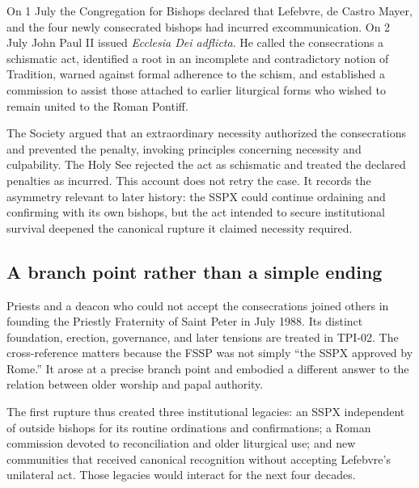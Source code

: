 On 1 July the Congregation for Bishops declared that Lefebvre, de Castro Mayer, and the four newly consecrated bishops had incurred excommunication. On 2 July John Paul II issued \emph{Ecclesia Dei adflicta}. He called the consecrations a schismatic act, identified a root in an incomplete and contradictory notion of Tradition, warned against formal adherence to the schism, and established a commission to assist those attached to earlier liturgical forms who wished to remain united to the Roman Pontiff.


The Society argued that an extraordinary necessity authorized the consecrations and prevented the penalty, invoking principles concerning necessity and culpability. The Holy See rejected the act as schismatic and treated the declared penalties as incurred. This account does not retry the case. It records the asymmetry relevant to later history: the SSPX could continue ordaining and confirming with its own bishops, but the act intended to secure institutional survival deepened the canonical rupture it claimed necessity required.

\subsection{A branch point rather than a simple ending}

Priests and a deacon who could not accept the consecrations joined others in founding the Priestly Fraternity of Saint Peter in July 1988. Its distinct foundation, erection, governance, and later tensions are treated in TPI-02. The cross-reference matters because the FSSP was not simply ``the SSPX approved by Rome.'' It arose at a precise branch point and embodied a different answer to the relation between older worship and papal authority.

The first rupture thus created three institutional legacies: an SSPX independent of outside bishops for its routine ordinations and confirmations; a Roman commission devoted to reconciliation and older liturgical use; and new communities that received canonical recognition without accepting Lefebvre's unilateral act. Those legacies would interact for the next four decades.
